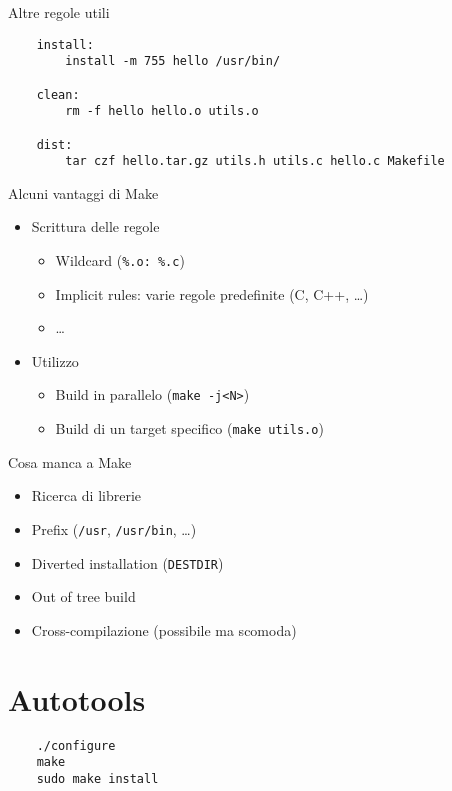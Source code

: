 \documentclass[xetex,table]{beamer}
\begin{document}
\begin{frame}[fragile]{Altre regole utili}
  \begin{verbatim}
    install:
        install -m 755 hello /usr/bin/

    clean:
        rm -f hello hello.o utils.o

    dist:
        tar czf hello.tar.gz utils.h utils.c hello.c Makefile
  \end{verbatim}
\end{frame}

\begin{frame}{Alcuni vantaggi di Make}
  \begin{itemize}
  \item Scrittura delle regole
    \begin{itemize}
    \item Wildcard (\texttt{\%.o: \%.c})
    \item Implicit rules: varie regole predefinite (C, C++, \dots)
    \item \dots
    \end{itemize}
  \item Utilizzo
    \begin{itemize}
    \item Build in parallelo (\texttt{make -j<N>})
    \item Build di un target specifico (\texttt{make utils.o})
    \end{itemize}
  \end{itemize}
\end{frame}

\begin{frame}{Cosa manca a Make}
  \begin{itemize}
  \item Ricerca di librerie
  \item Prefix (\texttt{/usr}, \texttt{/usr/bin}, \dots)
  \item Diverted installation (\texttt{DESTDIR})
  \item Out of tree build
  \item Cross-compilazione (possibile ma scomoda)
  \end{itemize}
\end{frame}

\section{Autotools}

\begin{frame}[fragile]
  \begin{center}
  \begin{verbatim}
    ./configure
    make
    sudo make install
  \end{verbatim}
  \end{center}
\end{frame}
\end{document}
